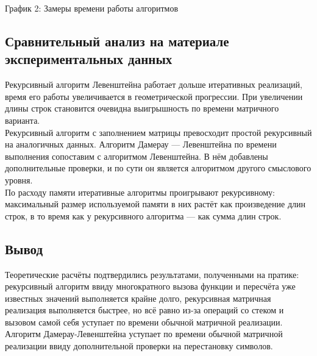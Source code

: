 \documentclass[12pt,a4paper]{article}
\begin{document}
\begin{center}
\begin{center}
	
\end{center}

\begin{center}
График 2: Замеры времени работы алгоритмов
\end{center}

\begin{flushleft}
\subsection{Сравнительный анализ на материале экспериментальных данных}
Рекурсивный алгоритм Левенштейна работает дольше итеративных реализаций, время его работы увеличивается в геометрической прогрессии. При увеличении длины строк становится очевидна выигрышность по времени матричного варианта.\\
Рекурсивный алгоритм с заполнением матрицы превосходит простой рекурсивный на аналогичных данных. Алгоритм Дамерау — Левенштейна по времени выполнения сопоставим с алгоритмом Левенштейна. В нём добавлены дополнительные проверки, и по сути он является алгоритмом другого смыслового уровня.\\
По расходу памяти итеративные алгоритмы проигрывают рекурсивному: максимальный размер используемой памяти в них растёт как произведение длин строк, в то время как у рекурсивного алгоритма — как сумма длин строк.
\subsection{Вывод}
Теоретические расчёты подтвердились результатами, полученными на пратике: рекурсивный алгоритм ввиду многократного вызова функции и пересчёта уже известных значений выполняется крайне долго, рекурсивная матричная реализация выполняется быстрее, но всё равно из-за операций со стеком и вызовом самой себя уступает по времени обычной матричной реализации. Алгоритм Дамерау-Левенштейна уступает по времени обычной матричной реализации ввиду дополнительной проверки на перестановку  символов.
\end{flushleft}
\clearpage



\end{center}
\end{document}
